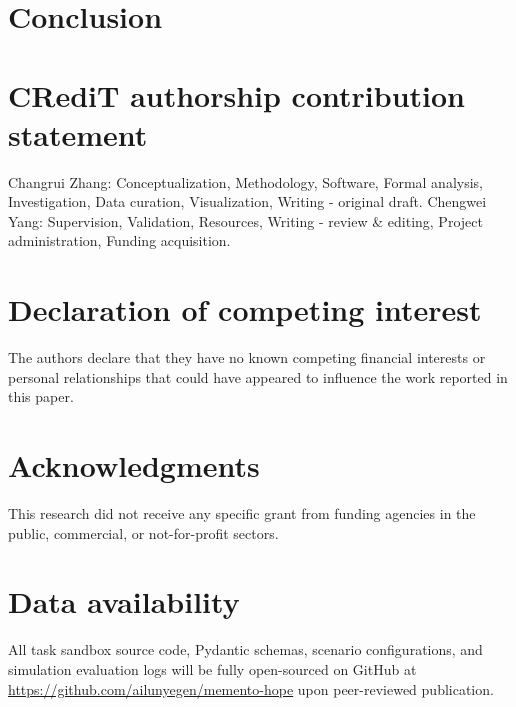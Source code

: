 \documentclass[preprint,12pt]{elsarticle}
\begin{document}
\section{Conclusion}


\clearpage
\appendix


\section*{CRediT authorship contribution statement}
Changrui Zhang: Conceptualization, Methodology, Software, Formal analysis, Investigation, Data curation, Visualization, Writing - original draft. Chengwei Yang: Supervision, Validation, Resources, Writing - review \& editing, Project administration, Funding acquisition.

\section*{Declaration of competing interest}
The authors declare that they have no known competing financial interests or personal relationships that could have appeared to influence the work reported in this paper.

\section*{Acknowledgments}
This research did not receive any specific grant from funding agencies in the public, commercial, or not-for-profit sectors.

\section*{Data availability}
All task sandbox source code, Pydantic schemas, scenario configurations, and simulation evaluation logs will be fully open-sourced on GitHub at \url{https://github.com/ailunyegen/memento-hope} upon peer-reviewed publication.


{\sloppy}
\end{document}
